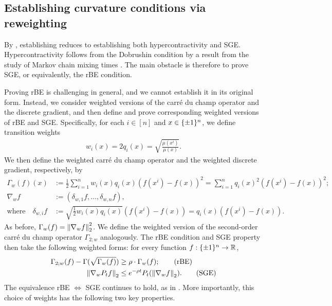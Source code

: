 \subsection{Establishing curvature conditions via reweighting}
By , establishing  reduces to establishing both hypercontractivity and SGE. Hypercontractivity follows from the Dobrushin condition by a result from the study of Markov chain mixing times \cite{marton2019logarithmic}. The main obstacle is therefore to prove SGE, or equivalently, the rBE condition. 

Proving rBE is challenging in general, and we cannot establish it in its original form. Instead, we consider weighted versions of the carr\'e du champ operator and the discrete gradient, and then define and prove corresponding weighted versions of rBE and SGE.
Specifically, for each $i \in [n]$ and $x \in \{\pm 1\}^n$, we define transition weights
\begin{align*}
    w_i(x) = 2 q_i(x) = \sqrt{\frac{\mu(x^i)}{\mu(x)}}.
\end{align*}
We then define the weighted carr\'e du champ operator and the weighted discrete gradient, respectively, by
\begin{align*}
    \Gamma_w(f)(x) &:= \frac 12\sum_{i=1}^n w_i(x) q_i(x)(f(x^i) - f(x))^2
    = \sum_{i=1}^n q_i(x)^2(f(x^i) - f(x))^2;\\
    \nabla_w f &:= (\delta_{w,1} f, \ldots, \delta_{w,n} f),\\
    \text{where} \quad \delta_{w,i} f &:= \sqrt{\frac 12 w_i(x) q_i(x)}(f(x^i) - f(x)) = q_i(x) (f(x^i) - f(x)).
\end{align*}
As before, $\Gamma_w(f) = \left\lVert \nabla_w f \right\rVert_2^2$.
We define the weighted version of the second-order carr\'e du champ operator $\Gamma_{2;w}$ analogously.
The rBE condition and SGE property then take the following weighted forms: for every function $f: \{\pm 1\}^n \to \mathbb{R}$,
\begin{align}
    \Gamma_{2;w}(f) - \Gamma(\sqrt{\Gamma_w(f)}) &\ge \rho \cdot \Gamma_w(f); \tag{rBE} \\
    \left\lVert \nabla_w P_t f \right\rVert_2 &\leq e^{-\rho t} P_t(\left\lVert \nabla_w f \right\rVert_2). \tag{SGE}
\end{align}
The equivalence rBE $\Leftrightarrow$ SGE continues to hold, as in .
More importantly, this choice of weights has the following two key properties.

